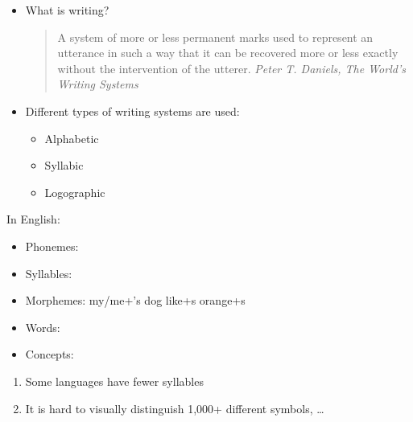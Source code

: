 \documentclass[a4paper,landscape,headrule,footrule,xetex]{foils}
\begin{document}

\begin{itemize}
\item What is writing?
\begin{quote}
  A system of more or less permanent marks used to represent an utterance in such a way that it can be recovered more or less exactly without the intervention of the utterer.  \hfill \textit{Peter T. Daniels, The World's Writing Systems}
\end{quote}

\item Different types of writing systems are used:
\begin{itemize}
\item Alphabetic
\item Syllabic
\item Logographic
\end{itemize}
\end{itemize}





In English:
\begin{itemize}
\item Phonemes:   

\item Syllables:    
\item Morphemes:  my/me+'s dog like+s orange+s   
\item Words:  
\item Concepts:   
\end{itemize}
\bigskip
\begin{enumerate}
\item Some languages have fewer syllables
\item It is hard to visually distinguish 1,000+ different symbols, \ldots
\end{enumerate}


\end{document}
